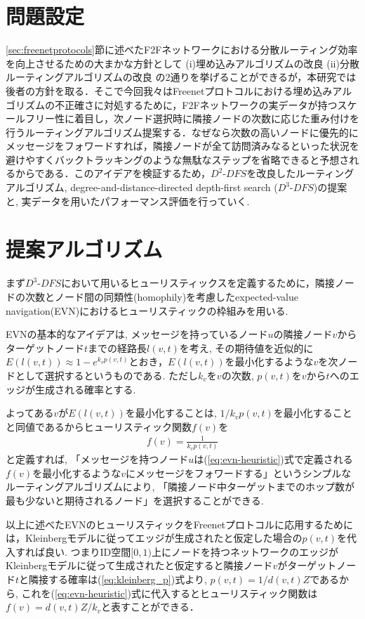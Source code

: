 \documentclass[technicalreport]{./ieicej-v3.0/UTF/ieicej}
\begin{document}
\section{問題設定}
\ref{sec:freenetprotocols}節に述べたF2Fネットワークにおける分散ルーティング効率を向上させるための大まかな方針として (i)埋め込みアルゴリズムの改良 (ii)分散ルーティングアルゴリズムの改良 の2通りを挙げることができるが，本研究では後者の方針を取る．そこで今回我々はFreenetプロトコルにおける埋め込みアルゴリズムの不正確さに対処するために，F2Fネットワークの実データが持つスケールフリー性に着目し，次ノード選択時に隣接ノードの次数に応じた重み付けを行うルーティングアルゴリズム提案する．なぜなら次数の高いノードに優先的にメッセージをフォワードすれば，隣接ノードが全て訪問済みなるといった状況を避けやすくバックトラッキングのような無駄なステップを省略できると予想されるからである．このアイデアを検証するため，$D^2$-$DFS$を改良したルーティングアルゴリズム, degree-and-distance-directed depth-first search ($D^3$-$DFS$)の提案と, 実データを用いたパフォーマンス評価を行っていく.

\section{提案アルゴリズム}
まず$D^3$-$DFS$において用いるヒューリスティックスを定義するために，隣接ノードの次数とノード間の同類性(homophily)を考慮したexpected-value navigation(EVN)\cite{simsek2008navigating}におけるヒューリスティックの枠組みを用いる.

   EVNの基本的なアイデアは, メッセージを持っているノード$u$の隣接ノード$v$からターゲットノード$t$までの経路長$l(v,t)$を考え, その期待値を近似的に$E(l(v,t)) \approx 1- e^{k_vp(v,t)}$とおき，$E(l(v,t))$を最小化するような$v$を次ノードとして選択するというものである. ただし$k_v$を$v$の次数, $p(v,t)$を$v$から$t$へのエッジが生成される確率とする.

    よってある$v$が$E(l(v,t))$を最小化することは, $1/k_vp(v,t)$を最小化することと同値であるからヒューリスティック関数$f(v)$を
    \begin{eqnarray}
     f(v) = \frac{1}{k_vp(v,t)}\label{eq:evn-heuristic}
    \end{eqnarray}
    と定義すれば, 「メッセージを持つノード$u$は(\ref{eq:evn-heuristic})式で定義される$f(v)$を最小化するような$v$にメッセージをフォワードする」というシンプルなルーティングアルゴリズムにより, 「隣接ノード中ターゲットまでのホップ数が最も少ないと期待されるノード」を選択することができる.

    以上に述べたEVNのヒューリスティックをFreenetプロトコルに応用するためには，Kleinbergモデルに従ってエッジが生成されたと仮定した場合の$p(v,t)$を代入すれば良い. つまりID空間$[0,1)$上にノードを持つネットワークのエッジがKleinbergモデルに従って生成されたと仮定すると隣接ノード$v$がターゲットノード$t$と隣接する確率は(\ref{eq:kleinberg_p})式より, $p(v,t) = 1/d(v,t)Z$であるから, これを(\ref{eq:evn-heuristic})式に代入するとヒューリスティック関数は$f(v) = d(v,t)Z/k_v$と表すことができる．
\end{document}
